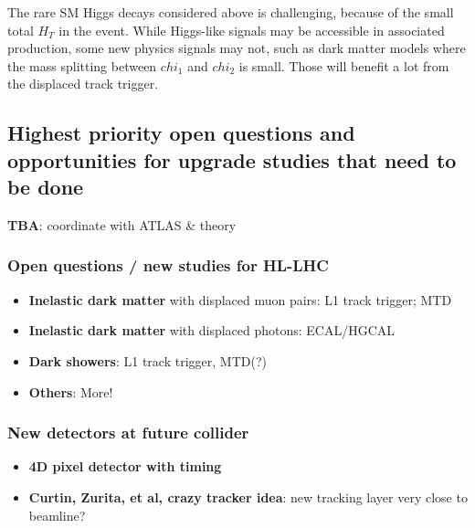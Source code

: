 The rare SM Higgs decays considered above is challenging, because of the small total $H_T$ in the event. 
While Higgs-like signals may be accessible in associated production, some new physics signals may not, such as dark matter models where the mass splitting between $chi_1$ and $chi_2$ is small. 
Those will benefit a lot from the displaced track trigger.

\subsection{Highest priority open questions and opportunities for upgrade studies that need to be done} \label{sec:upgradeideas}

\textbf{TBA}: coordinate with ATLAS \& theory

\subsubsection{Open questions / new studies for HL-LHC}

\begin{itemize}
\item \textbf{Inelastic dark matter} with displaced muon pairs: L1 track trigger; MTD
\item \textbf{Inelastic dark matter} with displaced photons: ECAL/HGCAL
\item \textbf{Dark showers}: L1 track trigger, MTD(?)
\item \textbf{Others}: More!
\end{itemize}

\subsubsection{New detectors at future collider}

\begin{itemize}
\item \textbf{4D pixel detector with timing} 
\item \textbf{Curtin, Zurita, et al, crazy tracker idea}: new tracking layer very close to beamline?
\end{itemize}
